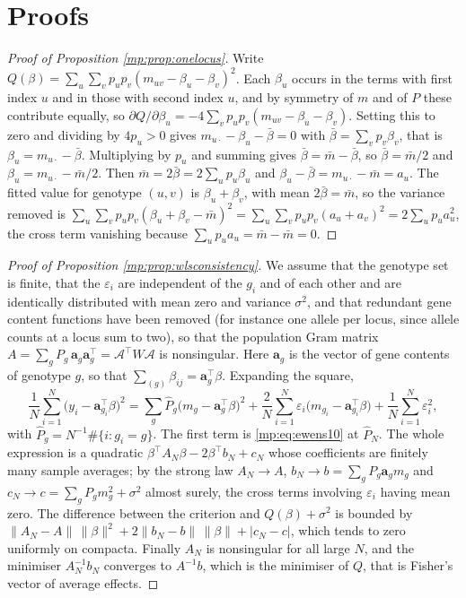 \section{Proofs}
\label{mp:app:proofs}

\begin{proof}[Proof of Proposition \ref{mp:prop:onelocus}]
Write $Q(\beta)=\sum_u\sum_v p_up_v(m_{uv}-\beta_u-\beta_v)^2$. Each $\beta_u$ occurs in the
terms with first index $u$ and in those with second index $u$, and by symmetry of $m$ and of
$P$ these contribute equally, so
$\partial Q/\partial\beta_u=-4\sum_v p_up_v(m_{uv}-\beta_u-\beta_v)$. Setting this to zero
and dividing by $4p_u>0$ gives $m_{u\cdot}-\beta_u-\bar\beta=0$ with
$\bar\beta=\sum_vp_v\beta_v$, that is $\beta_u=m_{u\cdot}-\bar\beta$. Multiplying by $p_u$
and summing gives $\bar\beta=\bar m-\bar\beta$, so $\bar\beta=\bar m/2$ and
$\beta_u=m_{u\cdot}-\bar m/2$. Then $\bar m=2\bar\beta=2\sum_up_u\beta_u$ and
$\beta_u-\bar\beta=m_{u\cdot}-\bar m=a_u$. The fitted value for genotype $(u,v)$ is
$\beta_u+\beta_v$, with mean $2\bar\beta=\bar m$, so the variance removed is
$\sum_u\sum_vp_up_v(\beta_u+\beta_v-\bar m)^2=\sum_u\sum_vp_up_v(a_u+a_v)^2=2\sum_up_ua_u^2$,
the cross term vanishing because $\sum_up_ua_u=\bar m-\bar m=0$.
\end{proof}

\begin{proof}[Proof of Proposition \ref{mp:prop:wlsconsistency}]
We assume that the genotype set is finite, that the $\varepsilon_i$ are independent of the
$g_i$ and of each other and are identically distributed with mean zero and variance $\sigma^2$, and that redundant gene
content functions have been removed (for instance one allele per locus, since allele counts at
a locus sum to two), so that the population Gram matrix
$A=\sum_gP_g\,\mathbf a_g\mathbf a_g^\top=\mathcal A^\top W\mathcal A$ is nonsingular. Here
$\mathbf a_g$ is the vector of gene contents of genotype $g$, so that
$\sum_{(g)}\beta_{ij}=\mathbf a_g^\top\beta$. Expanding the square,
\[
\frac1N\sum_{i=1}^N\big(y_i-\mathbf a_{g_i}^\top\beta\big)^2
=\sum_g\hat P_g\big(m_g-\mathbf a_g^\top\beta\big)^2
+\frac2N\sum_{i=1}^N\varepsilon_i\big(m_{g_i}-\mathbf a_{g_i}^\top\beta\big)
+\frac1N\sum_{i=1}^N\varepsilon_i^2 ,
\]
with $\hat P_g=N^{-1}\#\{i:g_i=g\}$. The first term is \eqref{mp:eq:ewens10} at $\hat P_N$. The
whole expression is a quadratic $\beta^\top A_N\beta-2\beta^\top b_N+c_N$ whose coefficients are
finitely many sample averages; by the strong law $A_N\to A$, $b_N\to b=\sum_gP_g\mathbf a_gm_g$
and $c_N\to c=\sum_gP_gm_g^2+\sigma^2$ almost surely, the cross terms involving $\varepsilon_i$
having mean zero. The difference between the criterion and $Q(\beta)+\sigma^2$ is bounded by
$\|A_N-A\|\,\|\beta\|^2+2\|b_N-b\|\,\|\beta\|+|c_N-c|$, which tends to zero uniformly on
compacta. Finally $A_N$ is nonsingular for all large $N$, and the minimiser
$A_N^{-1}b_N$ converges to $A^{-1}b$, which is the minimiser of $Q$, that is Fisher's vector
of average effects.
\end{proof}

